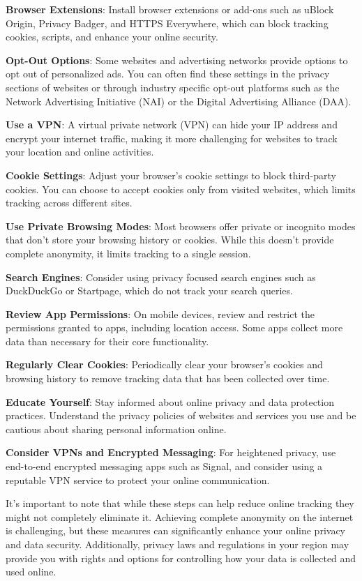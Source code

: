 \documentclass[
  letterpaper,
  DIV=11,
  numbers=noendperiod]{scrreprt}
\begin{document}
\textbf{Browser Extensions}: Install browser extensions or add-ons such
as uBlock Origin, Privacy Badger, and HTTPS Everywhere, which can block
tracking cookies, scripts, and enhance your online security.

\textbf{Opt-Out Options}: Some websites and advertising networks provide
options to opt out of personalized ads. You can often find these
settings in the privacy sections of websites or through industry
specific opt-out platforms such as the Network Advertising Initiative
(NAI) or the Digital Advertising Alliance (DAA).

\textbf{Use a VPN}: A virtual private network (VPN) can hide your IP
address and encrypt your internet traffic, making it more challenging
for websites to track your location and online activities.

\textbf{Cookie Settings}: Adjust your browser's cookie settings to block
third-party cookies. You can choose to accept cookies only from visited
websites, which limits tracking across different sites.

\textbf{Use Private Browsing Modes}: Most browsers offer private or
incognito modes that don't store your browsing history or cookies. While
this doesn't provide complete anonymity, it limits tracking to a single
session.

\textbf{Search Engines}: Consider using privacy focused search engines
such as DuckDuckGo or Startpage, which do not track your search queries.

\textbf{Review App Permissions}: On mobile devices, review and restrict
the permissions granted to apps, including location access. Some apps
collect more data than necessary for their core functionality.

\textbf{Regularly Clear Cookies}: Periodically clear your browser's
cookies and browsing history to remove tracking data that has been
collected over time.

\textbf{Educate Yourself}: Stay informed about online privacy and data
protection practices. Understand the privacy policies of websites and
services you use and be cautious about sharing personal information
online.

\textbf{Consider VPNs and Encrypted Messaging}: For heightened privacy,
use end-to-end encrypted messaging apps such as Signal, and consider
using a reputable VPN service to protect your online communication.

It's important to note that while these steps can help reduce online
tracking they might not completely eliminate it. Achieving complete
anonymity on the internet is challenging, but these measures can
significantly enhance your online privacy and data security.
Additionally, privacy laws and regulations in your region may provide
you with rights and options for controlling how your data is collected
and used online.
\end{document}
